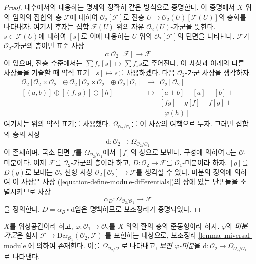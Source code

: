 \begin{proof}
대수에서의 대응하는 명제와 정확히 같은 방식으로 증명한다.
이 증명에서 $X$ 위의 임의의 집합의 층 $\mathcal{F}$에 대하여
$\mathcal{O}_2[\mathcal{F}]$로 전층
$U \mapsto \mathcal{O}_2(U)[\mathcal{F}(U)]$의 층화를 나타내자.
여기서 후자는 집합 $\mathcal{F}(U)$ 위의 자유
$\mathcal{O}_2(U)$-가군을 뜻한다. $s \in \mathcal{F}(U)$에 대하여
$[s]$로 이에 대응하는 $U$ 위의 $\mathcal{O}_2[\mathcal{F}]$의
단면을 나타낸다. $\mathcal{F}$가 $\mathcal{O}_2$-가군의 층이면
표준 사상
$$
c : \mathcal{O}_2[\mathcal{F}] \longrightarrow \mathcal{F}
$$
이 있으며, 전층 수준에서는
$\sum f_s[s] \mapsto \sum f_s s$로 주어진다. 이 사상과 아래의 다른
사상들을 기술할 때 약식 표기 $[s] \mapsto s$를 사용하겠다.
다음 $\mathcal{O}_2$-가군 사상을 생각하자.
\begin{equation}
\label{equation-define-module-differentials}
\begin{matrix}
\mathcal{O}_2[\mathcal{O}_2 \times \mathcal{O}_2] \oplus
\mathcal{O}_2[\mathcal{O}_2 \times \mathcal{O}_2] \oplus
\mathcal{O}_2[\mathcal{O}_1] &
\longrightarrow &
\mathcal{O}_2[\mathcal{O}_2] \\
[(a, b)] \oplus [(f, g)] \oplus [h] & \longmapsto & [a + b] - [a] - [b] + \\
& & [fg] - g[f] - f[g] + \\
& & [\varphi(h)]
\end{matrix}
\end{equation}
여기서는 위의 약식 표기를 사용했다.
$\Omega_{\mathcal{O}_2/\mathcal{O}_1}$를 이 사상의 여핵으로 두자.
그러면 집합의 층의 사상
$$
\text{d} : \mathcal{O}_2 \longrightarrow \Omega_{\mathcal{O}_2/\mathcal{O}_1}
$$
이 존재하며, 국소 단면 $f$를 $\Omega_{\mathcal{O}_2/\mathcal{O}_1}$에서
$[f]$의 상으로 보낸다. 구성에 의하여 $\text{d}$는
$\mathcal{O}_1$-미분이다. 이제 $\mathcal{F}$를
$\mathcal{O}_2$-가군의 층이라 하고,
$D : \mathcal{O}_2 \to \mathcal{F}$를 $\mathcal{O}_1$-미분이라 하자.
$[g]$를 $D(g)$로 보내는 $\mathcal{O}_2$-선형 사상
$\mathcal{O}_2[\mathcal{O}_2] \to \mathcal{F}$를 생각할 수 있다.
미분의 정의에 의하여 이 사상은 사상
(\ref{equation-define-module-differentials})의 상에 있는 단면들을
소멸시키므로 사상
$$
\alpha_D : \Omega_{\mathcal{O}_2/\mathcal{O}_1} \longrightarrow \mathcal{F}
$$
을 정의한다. $D = \alpha_D \circ \text{d}$임은 명백하므로
보조정리가 증명되었다.
\end{proof}

\begin{definition}
\label{definition-module-differentials}
$X$를 위상공간이라 하고,
$\varphi : \mathcal{O}_1 \to \mathcal{O}_2$를 $X$ 위의 환의 층의
준동형이라 하자. $\varphi$의 {\it 미분 가군}은 함자
$\mathcal{F} \mapsto \text{Der}_{\mathcal{O}_1}(\mathcal{O}_2, \mathcal{F})$
를 표현하는 대상으로, 보조정리 \ref{lemma-universal-module}에 의하여
존재한다. 이를 $\Omega_{\mathcal{O}_2/\mathcal{O}_1}$로 나타내고,
{\it 보편 $\varphi$-미분}을
$\text{d} : \mathcal{O}_2 \to \Omega_{\mathcal{O}_2/\mathcal{O}_1}$
로 나타낸다.
\end{definition}

